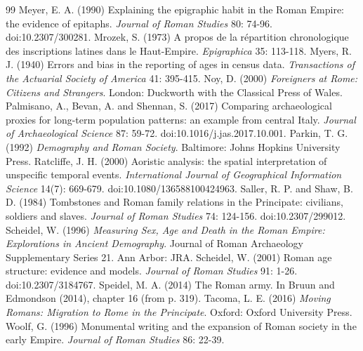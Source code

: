 \documentclass[11pt,a4paper]{article}
\begin{document}
\begin{thebibliography}{99}
 Meyer, E. A. (1990) Explaining the epigraphic habit in the Roman Empire: the evidence of epitaphs. \textit{Journal of Roman Studies} 80: 74-96. doi:10.2307/300281.
 Mrozek, S. (1973) A propos de la r{\'e}partition chronologique des inscriptions latines dans le Haut-Empire. \textit{Epigraphica} 35: 113-118.
 Myers, R. J. (1940) Errors and bias in the reporting of ages in census data. \textit{Transactions of the Actuarial Society of America} 41: 395-415.
 Noy, D. (2000) \textit{Foreigners at Rome: Citizens and Strangers}. London: Duckworth with the Classical Press of Wales.
 Palmisano, A., Bevan, A. and Shennan, S. (2017) Comparing archaeological proxies for long-term population patterns: an example from central Italy. \textit{Journal of Archaeological Science} 87: 59-72. doi:10.1016/j.jas.2017.10.001.
 Parkin, T. G. (1992) \textit{Demography and Roman Society}. Baltimore: Johns Hopkins University Press.
 Ratcliffe, J. H. (2000) Aoristic analysis: the spatial interpretation of unspecific temporal events. \textit{International Journal of Geographical Information Science} 14(7): 669-679. doi:10.1080/136588100424963.
 Saller, R. P. and Shaw, B. D. (1984) Tombstones and Roman family relations in the Principate: civilians, soldiers and slaves. \textit{Journal of Roman Studies} 74: 124-156. doi:10.2307/299012.
 Scheidel, W. (1996) \textit{Measuring Sex, Age and Death in the Roman Empire: Explorations in Ancient Demography}. Journal of Roman Archaeology Supplementary Series 21. Ann Arbor: JRA.
 Scheidel, W. (2001) Roman age structure: evidence and models. \textit{Journal of Roman Studies} 91: 1-26. doi:10.2307/3184767.
 Speidel, M. A. (2014) The Roman army. In Bruun and Edmondson (2014), chapter 16 (from p. 319).
 Tacoma, L. E. (2016) \textit{Moving Romans: Migration to Rome in the Principate}. Oxford: Oxford University Press.
 Woolf, G. (1996) Monumental writing and the expansion of Roman society in the early Empire. \textit{Journal of Roman Studies} 86: 22-39.
\end{thebibliography}

\appendix
\end{document}
